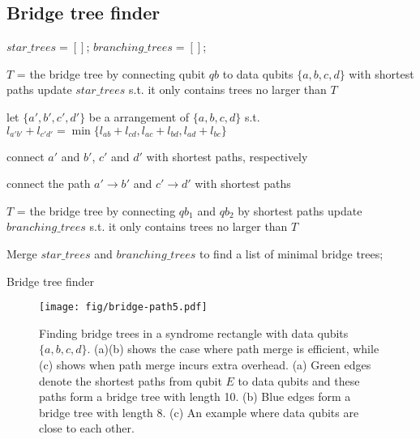 \subsection{Bridge tree finder}
\begin{algorithm}[h]\footnotesize
\SetAlgoLined
 

$star\_trees = []$; 
$branching\_trees = []$; 

 {
    $T$ = the bridge tree by connecting qubit $qb$ to data qubits $\{a,b,c,d\}$ with shortest paths\;
    update $star\_trees$ s.t. it only contains trees no larger than $T$\;
}

let $\{a',b',c',d'\}$ be a arrangement of $\{a,b,c,d\}$ s.t.  $l_{a'b'} + l_{c'd'} = \min \{ l_{ab} + l_{cd}, l_{ac} + l_{bd}, l_{ad} + l_{bc} \}$\; 

connect $a'$ and $b'$, $c'$ and $d'$ with shortest paths, respectively\;

connect the path $a' \to b'$ and $c' \to d'$ with shortest paths\;

 {
    $T$ = the bridge tree by connecting $qb_1$ and $qb_2$ by shortest paths\;
    update $branching\_trees$ s.t. it only contains trees no larger than $T$\;
    
}
Merge $star\_trees$ and $branching\_trees$ to find a list of minimal bridge trees;

\caption{Bridge tree finder}
\label{alg:bridge_tree_finder}
\end{algorithm}

\begin{figure}[ht!]
    \centering
    \texttt{[image: fig/bridge-path5.pdf]}
    \caption{ Finding bridge trees in a syndrome rectangle with data qubits $\{a,b,c,d\}$. (a)(b) shows the case where path merge is efficient, while (c) shows when path merge incurs extra overhead. (a) Green edges denote the shortest paths from qubit $E$ to data qubits and these paths form a bridge tree with length 10. (b) Blue edges form a bridge tree with length 8. (c) An example where data qubits are close to each other.}
    \label{fig:bridge_path}
\end{figure}

